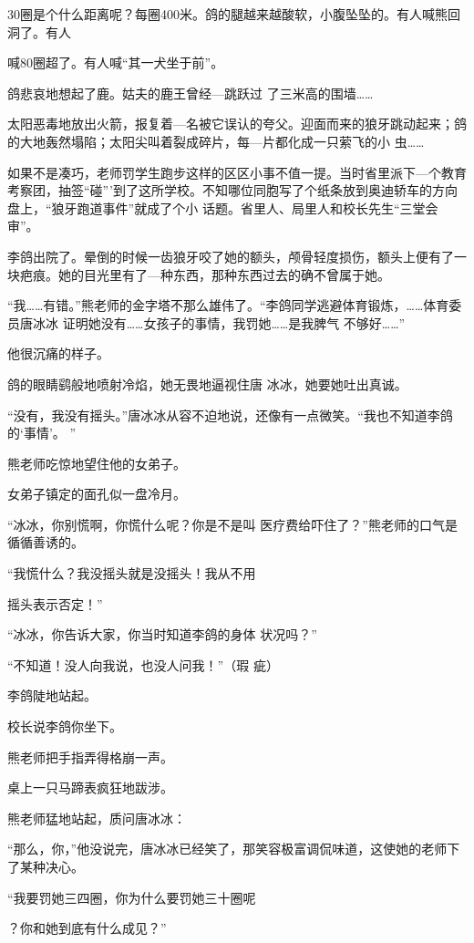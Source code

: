 \documentclass{article}
\begin{document}
30圈是个什么距离呢？每圈400米。鸽的腿越来越酸软，小腹坠坠的。有人喊熊回洞了。有人

\newpage
喊80圈超了。有人喊“其一犬坐于前”。 

鸽悲哀地想起了鹿。姑夫的鹿王曾经—跳跃过
了三米高的围墙…… 

太阳恶毒地放出火箭，报复着—名被它误认的夸父。迎面而来的狼牙跳动起来；鸽的大地轰然塌陷；太阳尖叫着裂成碎片，每—片都化成一只萦飞的小
虫…… 

如果不是凑巧，老师罚学生跑步这样的区区小事不值一提。当时省里派下—个教育考察团，抽签“碰”’到了这所学校。不知哪位同胞写了个纸条放到奥迪轿车的方向盘上，“狼牙跑道事件”就成了个小
话题。省里人、局里人和校长先生“三堂会审”。 

李鸽出院了。晕倒的时候一齿狼牙咬了她的额头，颅骨轻度损伤，额头上便有了一块疤痕。她的目光里有了—种东西，那种东西过去的确不曾属于她。

“我……有错。”熊老师的金字塔不那么雄伟了。“李鸽同学逃避体育锻炼，……体育委员唐冰冰
\newpage
证明她没有……女孩子的事情，我罚她……是我脾气
不够好……” 


他很沉痛的样子。 

鸽的眼睛鹞般地喷射冷焰，她无畏地逼视住唐
冰冰，她要她吐出真诚。 

“没有，我没有摇头。”唐冰冰从容不迫地说，还像有一点微笑。“我也不知道李鸽的‘事情’。
” 


熊老师吃惊地望住他的女弟子。 


女弟子镇定的面孔似一盘冷月。 

“冰冰，你别慌啊，你慌什么呢？你是不是叫
医疗费给吓住了？”熊老师的口气是循循善诱的。 

“我慌什么？我没摇头就是没摇头！我从不用

\newpage
摇头表示否定！” 

“冰冰，你告诉大家，你当时知道李鸽的身体
状况吗？” 

“不知道！没人向我说，也没人问我！”（瑕
疵） 


李鸽陡地站起。 


校长说李鸽你坐下。 


熊老师把手指弄得格崩一声。 


桌上一只马蹄表疯狂地跋涉。 


熊老师猛地站起，质问唐冰冰： 

“那么，你，”他没说完，唐冰冰已经笑了，那笑容极富调侃味道，这使她的老师下了某种决心。

“我要罚她三四圈，你为什么要罚她三十圈呢
\newpage

？你和她到底有什么成见？” 
\end{document}
